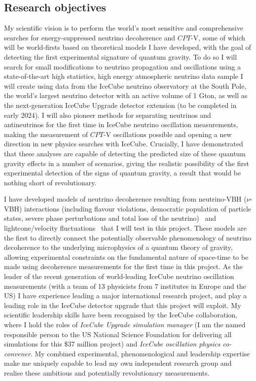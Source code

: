 \documentclass[a4paper,11pt]{article}
\begin{document}
\subsection{Research objectives}

My scientific vision is to perform the world's most sensitive and comprehensive searches for energy-suppressed neutrino decoherence and $CPT$-V, some of which will be world-firsts based on theoretical models I have developed, with the goal of detecting the first experimental signature of quantum gravity. To do so I will search for small modifications to neutrino propagation and oscillations using a state-of-the-art high statistics, high energy atmospheric neutrino data sample I will create using data from the IceCube neutrino observatory at the South Pole, the world's largest neutrino detector with an active volume of 1 Gton, as well as the next-generation IceCube Upgrade detector extension (to be completed in early 2024). I will also pioneer methods for separating neutrinos and antineutrinos for the first time in IceCube neutrino oscillation measurements, making the measurement of $CPT$-V oscillations possible and opening a new direction in new physics searches with IceCube. Crucially, I have demonstrated that these analyses are capable of detecting the predicted size of these quantum gravity effects in a number of scenarios, giving the realistic possibility of the first experimental detection of the signs of quantum gravity, a result that would be nothing short of revolutionary. 

I have developed models of neutrino decoherence resulting from neutrino-VBH ($\nu$-VBH) interactions (including flavour violations, democratic population of particle states, severe phase perturbations and total loss of the neutrino)~\cite{PhysRevD.102.115003} and lightcone/velocity fluctuations~\cite{2103.15313} that I will test in this project. These models are the first to directly connect the potentially observable phenomenology of neutrino decoherence to the underlying microphysics of a quantum theory of gravity, allowing experimental constraints on the fundamental nature of space-time to be made using decoherence measurements for the first time in this project. As the leader of the recent generation of world-leading IceCube neutrino oscillation measurements (with a team of 13 physicists from 7 institutes in Europe and the US) I have experience leading a major international research project, and play a leading role in the IceCube detector upgrade that this project will exploit. My scientific leadership skills have been recognised by the IceCube collaboration, where I hold the roles of \textit{IceCube Upgrade simulation manager} (I am the named responsible person to the US National Science Foundation for delivering all simulations for this \$37 million project) and \textit{IceCube oscillation physics co-convener}. My combined experimental, phenomenological and leadership expertise make me uniquely capable to lead my own independent research group and realise these ambitious and potentially revolutionary measurements. \\
\end{document}
